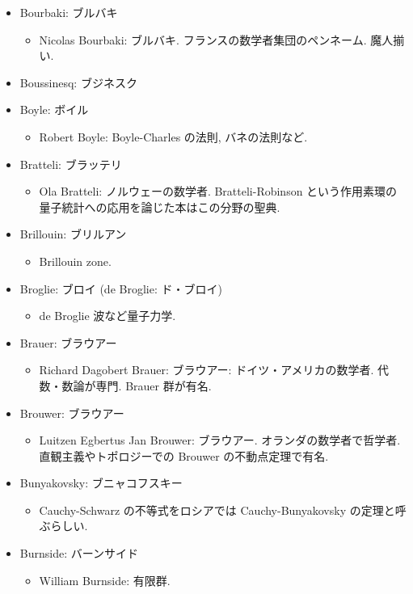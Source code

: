 \documentclass[openany, a4paper, oneside]{jsbook}
\begin{document}
\begin{itemize}
\item Bourbaki: ブルバキ
\begin{itemize}
\item Nicolas Bourbaki: ブルバキ. フランスの数学者集団のペンネーム. 魔人揃い.
\end{itemize}
\item Boussinesq: ブジネスク
\item Boyle: ボイル
\begin{itemize}
\item Robert Boyle: Boyle-Charles の法則, バネの法則など.
\end{itemize}
\item Bratteli: ブラッテリ
\begin{itemize}
\item Ola Bratteli: ノルウェーの数学者. Bratteli-Robinson という作用素環の量子統計への応用を論じた本はこの分野の聖典.
\end{itemize}
\item Brillouin: ブリルアン
\begin{itemize}
\item Brillouin zone.
\end{itemize}
\item Broglie: ブロイ (de Broglie: ド・ブロイ)
\begin{itemize}
\item de Broglie 波など量子力学.
\end{itemize}
\item Brauer: ブラウアー
\begin{itemize}
\item Richard Dagobert Brauer: ブラウアー: ドイツ・アメリカの数学者. 代数・数論が専門. Brauer 群が有名.
\end{itemize}
\item Brouwer: ブラウアー
\begin{itemize}
\item Luitzen Egbertus Jan Brouwer: ブラウアー. オランダの数学者で哲学者. 直観主義やトポロジーでの Brouwer の不動点定理で有名.
\end{itemize}
\item Bunyakovsky: ブニャコフスキー
\begin{itemize}
\item Cauchy-Schwarz の不等式をロシアでは Cauchy-Bunyakovsky の定理と呼ぶらしい.
\end{itemize}
\item Burnside: バーンサイド
\begin{itemize}
\item William Burnside: 有限群.
\end{itemize}
\end{itemize}
\end{document}
